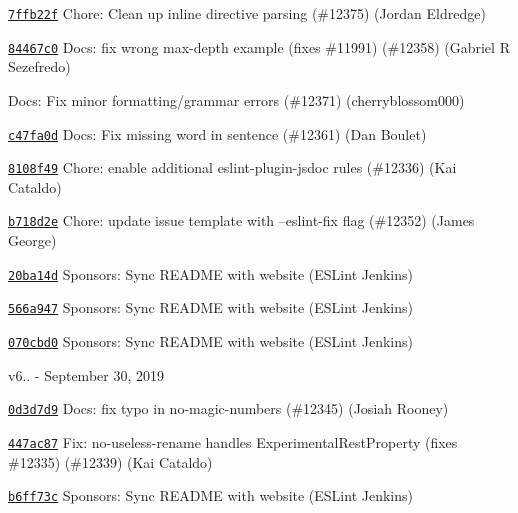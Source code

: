 \begin{DoxyItemize}
\item \href{https://github.com/eslint/eslint/commit/7ffb22f61cf1622511a7fe42b5ead7c3b216df5e}{\texttt{ {\ttfamily 7ffb22f}}} Chore\+: Clean up inline directive parsing (\#12375) (Jordan Eldredge)
\item \href{https://github.com/eslint/eslint/commit/84467c07461cc47ee43807ba9014e13700473c5c}{\texttt{ {\ttfamily 84467c0}}} Docs\+: fix wrong max-\/depth example (fixes \#11991) (\#12358) (Gabriel R Sezefredo)
\item \href{https://github.com/eslint/eslint/commit/364234262efabd91fa8bd53161d9d3e1e37e7944}{\texttt{ {}}} Docs\+: Fix minor formatting/grammar errors (\#12371) (cherryblossom000)
\item \href{https://github.com/eslint/eslint/commit/c47fa0dfc76211b3b0e5649c63acdd9606ce0eca}{\texttt{ {\ttfamily c47fa0d}}} Docs\+: Fix missing word in sentence (\#12361) (Dan Boulet)
\item \href{https://github.com/eslint/eslint/commit/8108f49f9fa0c2de80b3b66c847551beff585951}{\texttt{ {\ttfamily 8108f49}}} Chore\+: enable additional eslint-\/plugin-\/jsdoc rules (\#12336) (Kai Cataldo)
\item \href{https://github.com/eslint/eslint/commit/b718d2e6c9fe3fc56aa7cfc68b1a40b5cd8a7c01}{\texttt{ {\ttfamily b718d2e}}} Chore\+: update issue template with --eslint-\/fix flag (\#12352) (James George)
\item \href{https://github.com/eslint/eslint/commit/20ba14dc78fc2654b2920d14877dde21c6c10da4}{\texttt{ {\ttfamily 20ba14d}}} Sponsors\+: Sync R\+E\+A\+D\+ME with website (E\+S\+Lint Jenkins)
\item \href{https://github.com/eslint/eslint/commit/566a947f67c8038a50e204d68723519778a78a0f}{\texttt{ {\ttfamily 566a947}}} Sponsors\+: Sync R\+E\+A\+D\+ME with website (E\+S\+Lint Jenkins)
\item \href{https://github.com/eslint/eslint/commit/070cbd0a2ec07831962a25c4276d08e097302416}{\texttt{ {\ttfamily 070cbd0}}} Sponsors\+: Sync R\+E\+A\+D\+ME with website (E\+S\+Lint Jenkins)
\end{DoxyItemize}

v6.. -\/ September 30, 2019


\begin{DoxyItemize}
\item \href{https://github.com/eslint/eslint/commit/0d3d7d9cdd83a7f0e035c95f716a91b9ecc4868b}{\texttt{ {\ttfamily 0d3d7d9}}} Docs\+: fix typo in no-\/magic-\/numbers (\#12345) (Josiah Rooney)
\item \href{https://github.com/eslint/eslint/commit/447ac877e8ca2858d61b1e983f72d39e3e2ca74d}{\texttt{ {\ttfamily 447ac87}}} Fix\+: no-\/useless-\/rename handles Experimental\+Rest\+Property (fixes \#12335) (\#12339) (Kai Cataldo)
\item \href{https://github.com/eslint/eslint/commit/b6ff73cad13282fbfc91186cf4bc2f20278a8936}{\texttt{ {\ttfamily b6ff73c}}} Sponsors\+: Sync R\+E\+A\+D\+ME with website (E\+S\+Lint Jenkins)
\end{DoxyItemize}

